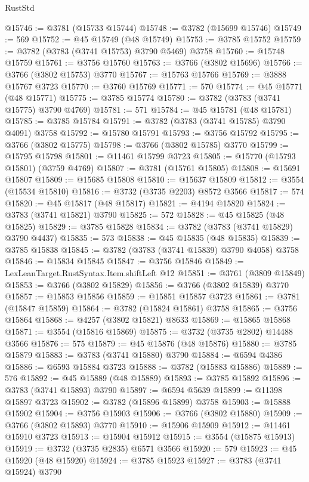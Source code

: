 \begin{lexlean}{RustStd}
\begin{coremodule}
@15746 := @3781 (@15733 @15744)
@15748 := @3782 (@15699 @15746)
@15749 := 569
@15752 := @45 @15749 (@48 @15749)
@15753 := @3785 @15752
@15759 := @3782 (@3783 (@3741 @15753) @3790 @5469) @3758
@15760 := @15748 @15759
@15761 := @3756 @15760
@15763 := @3766 (@3802 @15696)
@15766 := @3766 (@3802 @15753) @3770
@15767 := @15763 @15766
@15769 := @3888 @15767 @3723
@15770 := @3760 @15769
@15771 := 570
@15774 := @45 @15771 (@48 @15771)
@15775 := @3785 @15774
@15780 := @3782 (@3783 (@3741 @15775) @3790 @4769)
@15781 := 571
@15784 := @45 @15781 (@48 @15781)
@15785 := @3785 @15784
@15791 := @3782 (@3783 (@3741 @15785) @3790 @4091) @3758
@15792 := @15780 @15791
@15793 := @3756 @15792
@15795 := @3766 (@3802 @15775)
@15798 := @3766 (@3802 @15785) @3770
@15799 := @15795 @15798
@15801 := @11461 @15799 @3723
@15805 := @15770 (@15793 @15801) (@3759 @4769)
@15807 := @3781 (@15761 @15805)
@15808 := @15691 @15807
@15809 := @15685 @15808
@15810 := @15637 @15809
@15812 := @3554 (@15534 @15810)
@15816 := @3732 (@3735 @2203) @8572 @3566
@15817 := 574
@15820 := @45 @15817 (@48 @15817)
@15821 := @4194 @15820
@15824 := @3783 (@3741 @15821) @3790
@15825 := 572
@15828 := @45 @15825 (@48 @15825)
@15829 := @3785 @15828
@15834 := @3782 (@3783 (@3741 @15829) @3790 @4437)
@15835 := 573
@15838 := @45 @15835 (@48 @15835)
@15839 := @3785 @15838
@15845 := @3782 (@3783 (@3741 @15839) @3790 @4058) @3758
@15846 := @15834 @15845
@15847 := @3756 @15846
@15849 := LexLeanTarget.RustSyntax.Item.shiftLeft @12
@15851 := @3761 (@3809 @15849)
@15853 := @3766 (@3802 @15829)
@15856 := @3766 (@3802 @15839) @3770
@15857 := @15853 @15856
@15859 := @15851 @15857 @3723
@15861 := @3781 (@15847 @15859)
@15864 := @3782 (@15824 @15861) @3758
@15865 := @3756 @15864
@15868 := @4257 (@3802 @15821) @8633
@15869 := @15865 @15868
@15871 := @3554 (@15816 @15869)
@15875 := @3732 (@3735 @2802) @14488 @3566
@15876 := 575
@15879 := @45 @15876 (@48 @15876)
@15880 := @3785 @15879
@15883 := @3783 (@3741 @15880) @3790
@15884 := @6594 @4386
@15886 := @6593 @15884 @3723
@15888 := @3782 (@15883 @15886)
@15889 := 576
@15892 := @45 @15889 (@48 @15889)
@15893 := @3785 @15892
@15896 := @3783 (@3741 @15893) @3790
@15897 := @6594 @5639
@15899 := @11398 @15897 @3723
@15902 := @3782 (@15896 @15899) @3758
@15903 := @15888 @15902
@15904 := @3756 @15903
@15906 := @3766 (@3802 @15880)
@15909 := @3766 (@3802 @15893) @3770
@15910 := @15906 @15909
@15912 := @11461 @15910 @3723
@15913 := @15904 @15912
@15915 := @3554 (@15875 @15913)
@15919 := @3732 (@3735 @2835) @6571 @3566
@15920 := 579
@15923 := @45 @15920 (@48 @15920)
@15924 := @3785 @15923
@15927 := @3783 (@3741 @15924) @3790

\end{coremodule}
\end{lexlean}
